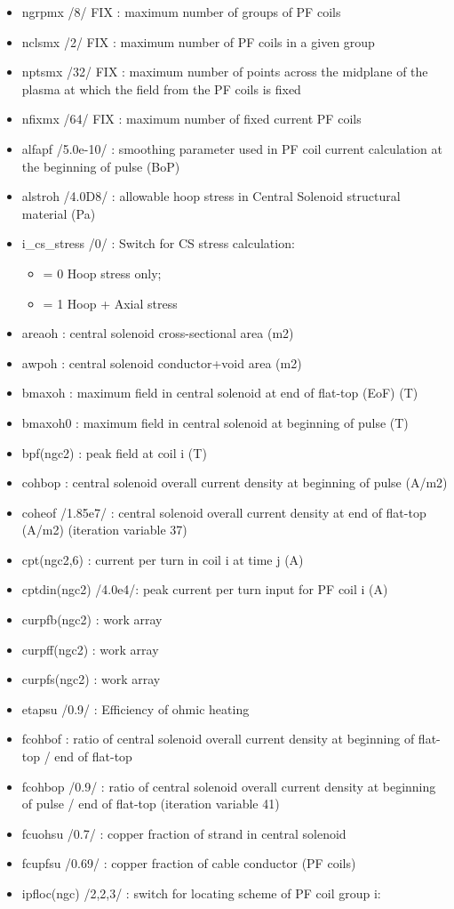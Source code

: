 \documentclass[]{article}
\providecommand{\tightlist}{%
  \setlength{\itemsep}{0pt}\setlength{\parskip}{0pt}}
\begin{document}
\begin{itemize}
\tightlist
\item
  ngrpmx /8/ FIX : maximum number of groups of PF coils
\item
  nclsmx /2/ FIX : maximum number of PF coils in a given group
\item
  nptsmx /32/ FIX : maximum number of points across the midplane of the
  plasma at which the field from the PF coils is fixed
\item
  nfixmx /64/ FIX : maximum number of fixed current PF coils
\item
  alfapf /5.0e-10/ : smoothing parameter used in PF coil current
  calculation at the beginning of pulse (BoP)
\item
  alstroh /4.0D8/ : allowable hoop stress in Central Solenoid structural
  material (Pa)
\item
  i\_cs\_stress /0/ : Switch for CS stress calculation:

  \begin{itemize}
  \tightlist
  \item
    = 0 Hoop stress only;
  \item
    = 1 Hoop + Axial stress
  \end{itemize}
\item
  areaoh : central solenoid cross-sectional area (m2)
\item
  awpoh : central solenoid conductor+void area (m2)
\item
  bmaxoh : maximum field in central solenoid at end of flat-top (EoF)
  (T)
\item
  bmaxoh0 : maximum field in central solenoid at beginning of pulse (T)
\item
  bpf(ngc2) : peak field at coil i (T)
\item
  cohbop : central solenoid overall current density at beginning of
  pulse (A/m2)
\item
  coheof /1.85e7/ : central solenoid overall current density at end of
  flat-top (A/m2) (iteration variable 37)
\item
  cpt(ngc2,6) : current per turn in coil i at time j (A)
\item
  cptdin(ngc2) /4.0e4/: peak current per turn input for PF coil i (A)
\item
  curpfb(ngc2) : work array
\item
  curpff(ngc2) : work array
\item
  curpfs(ngc2) : work array
\item
  etapsu /0.9/ : Efficiency of ohmic heating
\item
  fcohbof : ratio of central solenoid overall current density at
  beginning of flat-top / end of flat-top
\item
  fcohbop /0.9/ : ratio of central solenoid overall current density at
  beginning of pulse / end of flat-top (iteration variable 41)
\item
  fcuohsu /0.7/ : copper fraction of strand in central solenoid
\item
  fcupfsu /0.69/ : copper fraction of cable conductor (PF coils)
\item
  ipfloc(ngc) /2,2,3/ : switch for locating scheme of PF coil group i:


\end{itemize}
\end{document}
